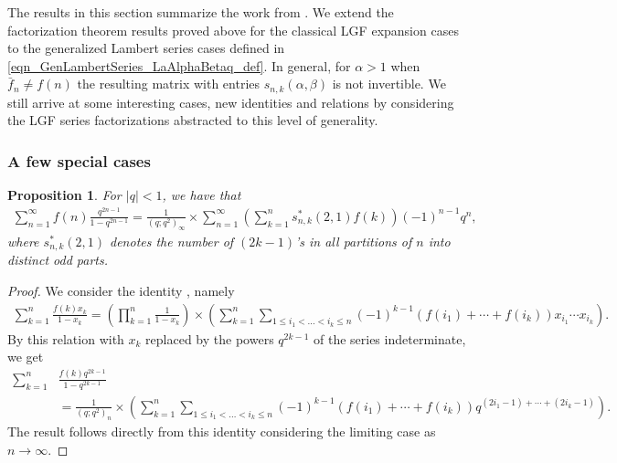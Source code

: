 \documentclass[12pt,reqno,a4letter]{article}
\numberwithin{figure}{section}
\numberwithin{table}{section}
\numberwithin{equation}{section}
\theoremstyle{plain}
\newtheorem{prop}[theorem]{Proposition}
\numberwithin{theorem}{section}
\theoremstyle{definition}
\begin{document}
The results in this section summarize the work from \cite{MERCA-SCHMIDT-RAMJ}. 
We extend the factorization theorem results proved above for the classical LGF
expansion cases to the generalized Lambert series cases 
defined in \eqref{eqn_GenLambertSeries_LaAlphaBetaq_def}. 
In general, for $\alpha > 1$ when $\bar{f}_n \neq f(n)$ the resulting matrix with entries 
$s_{n,k}(\alpha, \beta)$ is not invertible. We still arrive at some interesting cases, 
new identities and relations by considering the LGF series factorizations abstracted to this 
level of generality. 

\subsubsection{A few special cases} 

\begin{prop}
\label{prop_first_spcase_result} 
For $|q|<1$, we have that 
\begin{align*}
\sum_{n=1}^{\infty} f(n) \frac{q^{2n-1}}{1-q^{2n-1}} = \frac{1}{(q;q^2)_\infty} \times 
     \sum_{n=1}^{\infty} \left(\sum_{k=1}^n s_{n,k}^{\ast}(2, 1) f(k)\right) (-1)^{n-1} q^n,
\end{align*}
where $s_{n,k}^{\ast}(2, 1)$ denotes the number of $(2k-1)$'s in all partitions of $n$ 
into distinct odd parts.
\end{prop} 
\begin{proof}
We consider the identity \cite[eq. 2.1]{MERCA-LSFACTTHM}, namely
\begin{align*}
\sum_{k=1}^n \frac{f(k) x_k}{1-x_k} = \left( \prod_{k=1}^{n} \frac{1}{1-x_k}\right) \times \left( 
	\sum_{k=1}^{n} \sum_{1\leq i_1 < \ldots <i_k\leq n} (-1)^{k-1} 
     (f({i_1})+\cdots +f({i_k})) x_{i_1}\cdots x_{i_k}\right).
\end{align*}
By this relation with $x_k$ replaced by the powers $q^{2k-1}$ of the series indeterminate, we get
\begin{align*}
\sum_{k=1}^n & \frac{f(k) q^{2k-1}}{1-q^{2k-1}} \\ 
     & = \frac{1}{(q;q^2)_n} \times \left(  \sum_{k=1}^{n} \sum_{1\leq i_1 < \ldots <i_k\leq n} (-1)^{k-1} 
     \left(f({i_1})+\cdots +f({i_k})\right) q^{(2i_1-1)+\cdots+(2i_k-1)}\right) .
\end{align*}	
The result follows directly from this identity considering the 
limiting case as $n \rightarrow \infty$.
\end{proof}
\end{document}
